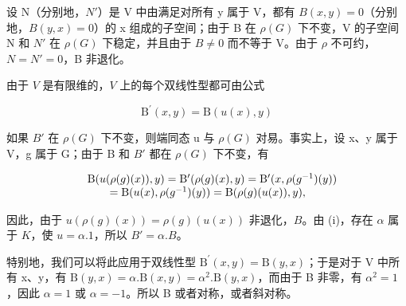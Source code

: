 设 N（分别地，\(N'\)）是 V 中由满足对所有 y 属于 V，都有 \(B(x,y)=0\)（分别地，\(B(y,x)=0\)）的 x 组成的子空间；由于 B 在 \(\rho(G)\) 下不变，V 的子空间 N 和 \(N'\) 在 \(\rho(G)\) 下稳定，并且由于 \(B\neq0\) 而不等于 V。由于 \(\rho\) 不可约，\(N=N'=0\)，B 非退化。

由于 \(V\) 是有限维的，\(V\) 上的每个双线性型都可由公式

\[
\mathrm{B} ^ {\prime} (x, y) = \mathrm{B} (u (x), y)\tag{3}
\]

如果 \(B'\) 在 \(\rho(G)\) 下不变，则端同态 u 与 \(\rho(G)\) 对易。事实上，设 x、y 属于 V，g 属于 G；由于 B 和 \(B'\) 都在 \(\rho(G)\) 下不变，有

\[
\begin{array}{r l} & {\mathrm{B} (u (\rho (g) (x)), y) = \mathrm{B} ^ {\prime} (\rho (g) (x), y) = \mathrm{B} ^ {\prime} (x, \rho (g ^ {- 1}) (y))} \\ & {\qquad = \mathrm{B} (u (x), \rho (g ^ {- 1}) (y)) = \mathrm{B} (\rho (g) (u (x)), y),} \end{array}
\]

因此，由于 \(u(\rho(g)(x)) = \rho(g)(u(x))\) 非退化，\(B\)。由 (i)，存在 \(\alpha\) 属于 \(K\)，使 \(u = \alpha.1\)，所以 \(B' = \alpha.B\)。

特别地，我们可以将此应用于双线性型 \(\mathrm{B}^{\prime}(x,y)=\mathrm{B}(y,x)\)；于是对于 V 中所有 x、y，有 \(\mathrm{B}(y,x)=\alpha.\mathrm{B}(x,y)=\alpha^{2}.\mathrm{B}(y,x)\)，而由于 B 非零，有 \(\alpha^{2}=1\)，因此 \(\alpha=1\) 或 \(\alpha=-1\)。所以 B 或者对称，或者斜对称。

